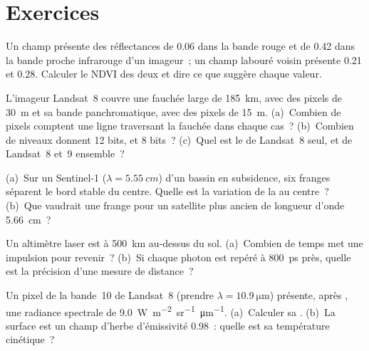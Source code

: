 \section{Exercices}

\begin{exercise}[$\star$]\label{exo:b3:remote-sensing-gis:1}
Un champ présente des réflectances de 0.06 dans la bande rouge et de 0.42 dans la
bande proche infrarouge d'un imageur~; un champ labouré voisin présente 0.21 et
0.28. Calculer le NDVI des deux et dire ce que suggère chaque valeur.
\end{exercise}

\begin{exercise}[$\star$]\label{exo:b3:remote-sensing-gis:2}
L'imageur Landsat~8 couvre une fauchée large de \qty{185}{km}, avec des pixels de \qty{30}{m}
et sa bande panchromatique, avec des pixels de \qty{15}{m}. (a)~Combien de pixels comptent une ligne
traversant la fauchée dans chaque cas~? (b)~Combien de niveaux
donnent 12 bits, et 8 bits~? (c)~Quel est le  de Landsat~8
seul, et de Landsat~8 et~9 ensemble~?
\end{exercise}

\begin{exercise}[$\star$]\label{exo:b3:remote-sensing-gis:3}
(a)~Sur un  Sentinel-1 ($\lambda = \qty{5.55}{cm}$) d'un bassin en
subsidence, six franges séparent le bord stable du centre.
Quelle est la variation de la  au centre~? (b)~Que vaudrait une frange
pour un satellite plus ancien de longueur d'onde \qty{5.66}{cm}~?
\end{exercise}

\begin{exercise}[$\star$]\label{exo:b3:remote-sensing-gis:4}
Un altimètre laser est à \qty{500}{km} au-dessus du sol. (a)~Combien de temps met une
impulsion pour revenir~? (b)~Si chaque photon est repéré à \qty{800}{ps} près, quelle
est la précision d'une mesure de distance~?
\end{exercise}

\begin{exercise}[$\star\star$]\label{exo:b3:remote-sensing-gis:5}
Un pixel de la bande~10 de Landsat~8 (prendre $\lambda = \qty{10.9}{\micro\metre}$)
présente, après , une radiance spectrale de
\qty{9.0}{W.m^{-2}.sr^{-1}.\micro\metre^{-1}}. (a)~Calculer sa . (b)~La surface est un champ d'herbe d'émissivité 0.98~: quelle est
sa température cinétique~?
\end{exercise}

